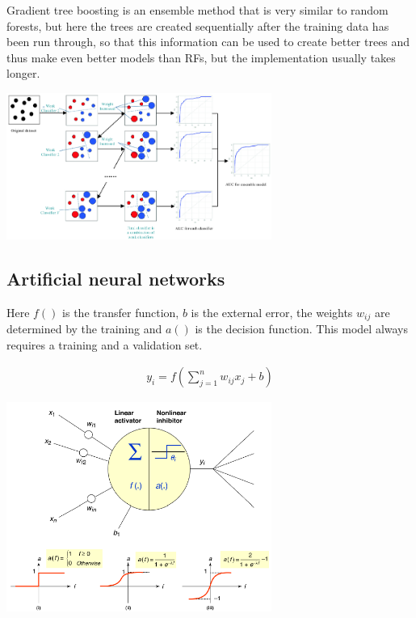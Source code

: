 Gradient tree boosting is an ensemble method that is very similar to random forests, but here the trees are created sequentially after the training data has been run through, so that this information can be used to create better trees and thus make even better models than RFs, but the implementation usually takes longer.

\begin{center}\includegraphics[width=0.65\textwidth]{img/machine/MachineEnsembleGradientTreeBoosting.png}\end{center}

\subsection{Artificial neural networks}


Here $f()$ is the transfer function, $b$ is the external error, the weights $w_{ij}$ are determined by the training and $a()$ is the decision function. This model always requires a training and a validation set.

\begin{align}
    y_i=f\left(\sum_{j=1}^{n}w_{ij}x_j+b\right)
\end{align}

\begin{center}\includegraphics[width=0.65\textwidth]{img/machine/MachineArtificialNeuralNetworks.png}\end{center}

